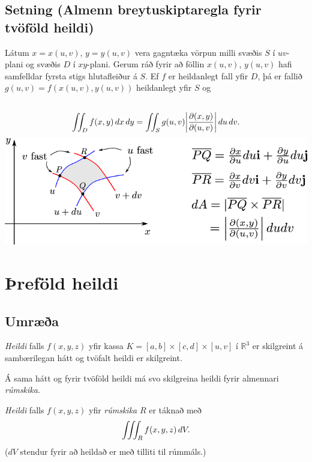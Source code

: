 \documentclass[a4paper,10pt,icelandic]{sphinxmanual}
\begin{document}
\subsection{Setning (Almenn breytuskiptaregla fyrir tvöföld heildi)}
\label{Kafli4:setning-almenn-breytuskiptaregla-fyrir-tvofold-heildi}
Látum \(x=x(u,v)\), \(y=y(u,v)\) vera gagntæka vörpun milli
svæðis \(S\) í \(uv\)-plani og svæðis \(D\) í
\(xy\)-plani. Gerum ráð fyrir að föllin \(x(u,v)\),
\(y(u,v)\) hafi samfelldar fyrsta stigs hlutafleiður á \(S\). Ef
\(f\) er heildanlegt fall yfir \(D\), þá er fallið
\(g(u,v)=f(x(u,v), y(u,v))\) heildanlegt yfir \(S\) og
\begin{gather}
\begin{split}\displaystyle\end{split}\notag\\\begin{split}\int\!\!\!\int_D f(x,y)\,dx\,dy=\int\!\!\!\int_S g(u,v)
\bigg|\frac{\partial(x,y)}{\partial(u,v)}\bigg|\,du\,dv.\end{split}\notag
\end{gather}
{\hfill\includegraphics[width=0.900\linewidth]{changevar.png}\hfill}


\section{Þreföld heildi}
\label{Kafli4:refold-heildi}\label{Kafli4:index-11}

\subsection{Umræða}
\label{Kafli4:id15}
\textit{Heildi} falls \(f(x,y,z)\) yfir kassa
\(K=[a,b]\times[c,d]\times[u,v]\) í \({\mathbb  R}^3\) er
skilgreint á sambærilegan hátt og tvöfalt heildi er skilgreint.

Á sama hátt og fyrir tvöföld heildi má svo skilgreina heildi fyrir
almennari \textit{rúmskika}.

\textit{Heildi} falls \(f(x,y,z)\) yfir \textit{rúmskika} \(R\) er táknað með
\begin{gather}
\begin{split}\displaystyle \int\!\!\!\int\!\!\!\int_R f(x,y,z)\,dV.\end{split}\notag
\end{gather}
(\(dV\) stendur fyrir að heildað er með tilliti til rúmmáls.)
\end{document}
